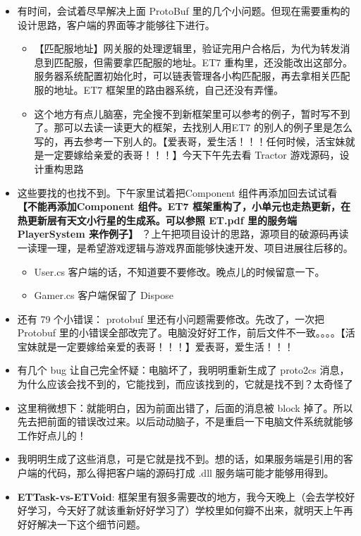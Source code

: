 \documentclass[9pt, b5paper]{article}
\begin{document}
\begin{itemize}
\item 有时间，会试着尽早解决上面 ProtoBuf 里的几个小问题。但现在需要重构的设计思路，客户端的界面等才能够往下进行。 
\begin{itemize}
\item 【匹配服地址】网关服的处理逻辑里，验证完用户合格后，为代为转发消息到匹配服，但需要拿匹配服的地址。ET7 重构里，还没能改出这部分。服务器系统配置初始化时，可以链表管理各小构匹配服，再去拿相关匹配服的地址。ET7 框架里的路由器系统，自己还没有弄懂。
\item 这个地方有点儿脑塞，完全搜不到新框架里可以参考的例子，暂时写不到了。那可以去读一读更大的框架，去找别人用ET7 的别人的例子里是怎么写的，再去参考一下别人的。【爱表哥，爱生活！！！任何时候，活宝妹就是一定要嫁给亲爱的表哥！！！】今天下午先去看 Tractor 游戏源码，设计重构思路
\end{itemize}
\item 这些要找的也找不到。下午家里试着把Component 组件再添加回去试试看 \textbf{【不能再添加Component 组件。ET7 框架重构了，小单元也走热更新，在热更新层有天文小行星的生成系。可以参照 ET.pdf 里的服务端 PlayerSystem 来作例子】} ？上午把项目设计的思路，源项目的破源码再读一读理一理，是希望游戏逻辑与游戏界面能够快速开发、项目进展往后移的。
\begin{itemize}
\item User.cs 客户端的话，不知道要不要修改。晚点儿的时候留意一下。
\item Gamer.cs 客户端保留了 Dispose
\end{itemize}
\item 还有 79 个小错误： protobuf 里还有小问题需要修改。先改了，一次把 Protobuf 里的小错误全部改完了。电脑没好好工作，前后文件不一致。。。。【活宝妹就是一定要嫁给亲爱的表哥！！！】爱表哥，爱生活！！！
\item 有几个 bug 让自己完全怀疑：电脑坏了，我明明重新生成了 proto2cs 消息，为什么应该会找不到的，它能找到，而应该找到的，它就是找不到？太奇怪了
\item 这里稍微想下：就能明白，因为前面出错了，后面的消息被 block 掉了。所以先去把前面的错误改过来。以后动动脑子，不是重启一下电脑文件系统就能够工作好点儿的！
\item 我明明生成了这些消息，可是它就是找不到。想的话，如果服务端是引用的客户端的代码，那么得把客户端的源码打成 .dll 服务端可能才能够用得到。
\item \textbf{ETTask-vs-ETVoid}: 框架里有狠多需要改的地方，我今天晚上（会去学校好好学习，今天好了就该重新好好学习了）学校里如何瓣不出来，就明天上午再好好解决一下这个细节问题。
\begin{itemize}

\end{itemize}
\end{itemize}
\end{document}
